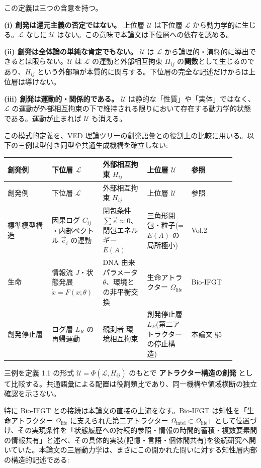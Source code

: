 この定義は三つの含意を持つ。

\textbf{(i) 創発は還元主義の否定ではない。}
上位層 $\mathcal{U}$ は下位層 $\mathcal{L}$ から動力学的に生じる。$\mathcal{L}$ なしに $\mathcal{U}$ はない。この意味で本論文は下位層への依存を認める。

\textbf{(ii) 創発は全体論の単純な肯定でもない。}
$\mathcal{U}$ は $\mathcal{L}$ から論理的・演繹的に導出できるとは限らない。$\mathcal{U}$ は $\mathcal{L}$ の運動と外部相互拘束 $H_{ij}$ の\textbf{関数}として生じるのであり、$H_{ij}$ という外部項が本質的に関与する。下位層の完全な記述だけからは上位層は導けない。

\textbf{(iii) 創発は運動的・関係的である。}
$\mathcal{U}$ は静的な「性質」や「実体」ではなく、$\mathcal{L}$ の運動が外部相互拘束の下で維持される限りにおいて存在する動力学的状態である。運動が止まれば $\mathcal{U}$ も消える。

この模式的定義を、VED 理論ツリーの創発語彙との役割上の比較に用いる。以下の三例は型付き同型や共通生成機構を確立しない:

\begin{longtable}{@{}p{0.18\linewidth}p{0.18\linewidth}p{0.18\linewidth}p{0.18\linewidth}p{0.18\linewidth}@{}}
\toprule
創発例 & 下位層 $\mathcal{L}$ & 外部相互拘束 $H_{ij}$ & 上位層 $\mathcal{U}$ & 参照 \\
\midrule
\endfirsthead
\toprule
創発例 & 下位層 $\mathcal{L}$ & 外部相互拘束 $H_{ij}$ & 上位層 $\mathcal{U}$ & 参照 \\
\midrule
\endhead
標準模型構造 & 因果ログ $C_{ij}$ ・内部ベクトル $\vec{e}_i$ の運動 & 閉包条件 $\sum \vec{e} \approx 0$、閉包エネルギー $E(A)$ & 三角形閉包・粒子(= $E(A)$ の局所極小) & Vol.2 \\
生命 & 情報流 $J$・状態発展 $\dot{x}=F(x;\theta)$ & DNA 由来パラメータ $\theta$、環境との非平衡交換 & 生命アトラクター $\Omega_{\text{life}}$ & Bio-IFGT \\
創発停止層 & ログ層 $L_R$ の再帰運動 & 観測者-環境相互拘束 & 創発停止層 $L_E$(第二アトラクターの停止構造) & 本論文 \S{}5 \\
\bottomrule
\end{longtable}


三例を定義 1.1 の形式 $\mathcal{U} = \Phi(\mathcal{L}, H_{ij})$ のもとで \textbf{アトラクター構造の創発} として比較する。共通語彙による配置は役割類比であり、同一機構や領域横断の独立確認を示さない。

特に Bio-IFGT との接続は本論文の直接の上流をなす。Bio-IFGT は知性を「生命アトラクター $\Omega_{\text{life}}$ に支えられた第二アトラクター $\Omega_{\text{intel}} \subset \Omega_{\text{life}}$」として位置づけ、その実現条件を「状態履歴への持続的参照・情報の時間的蓄積・複数要素間の情報共有」と述べ、その具体的実装(記憶・言語・個体間共有)を後続研究へ開いていた。本論文の三層動力学は、まさにこの開かれた問いに対する知性層内部の構造的記述である:

